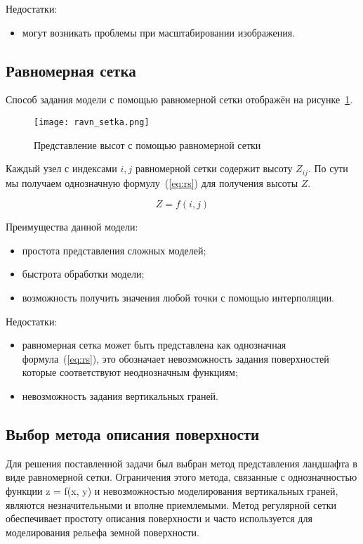 Недостатки:
\begin{itemize}
	\item могут возникать проблемы при масштабировании изображения.
\end{itemize}

\subsection{Равномерная сетка}

Способ задания модели с помощью равномерной сетки отображён на рисунке~\ref{fig:r_setka}.

\begin{figure}[H]
	\centering
	\texttt{[image: ravn\_setka.png]}
	\caption{Представление высот с помощью равномерной сетки}
	\label{fig:r_setka}
\end{figure}

Каждый узел с индексами $i, j$ равномерной сетки содержит высоту $Z_{ij}$. По сути мы получаем однозначную формулу~(\ref{eq:rs}) для получения высоты $Z$.

\begin{equation}
	Z = f(i, j)
	\label{eq:rs}
\end{equation}

Преимущества данной модели:

\begin{itemize}
	\item простота представления сложных моделей;
	\item быстрота обработки модели;
	\item возможность получить значения любой точки с помощью интерполяции.
\end{itemize}

Недостатки:
\begin{itemize}
	\item равномерная сетка может быть представлена как однозначная формула~(\ref{eq:rs}), это обозначает невозможность задания поверхностей которые соответствуют неоднозначным функциям;
	\item невозможность задания вертикальных граней.
\end{itemize}

\subsection*{Выбор метода описания поверхности}

Для решения поставленной задачи был выбран метод представления ландшафта в виде равномерной сетки. Ограничения этого метода, связанные с однозначностью функции z = f(x, y) и невозможностью моделирования вертикальных граней, являются незначительными и вполне приемлемыми. Метод регулярной сетки обеспечивает простоту описания поверхности и часто используется для моделирования рельефа земной поверхности.

